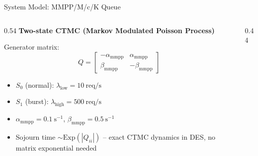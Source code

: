 \documentclass[aspectratio=169,t]{beamer}
\begin{document}
\begin{frame}{System Model: MMPP/M/c/K Queue}

  \begin{columns}[T]
    \begin{column}{0.54\textwidth}
      \textbf{Two-state CTMC (Markov Modulated Poisson Process)}

      \vspace{4pt}
      Generator matrix:
      \[
        Q = \begin{bmatrix}
          -\alpha_{\mathrm{mmpp}} & \alpha_{\mathrm{mmpp}} \\
          \beta_{\mathrm{mmpp}}   & -\beta_{\mathrm{mmpp}}
        \end{bmatrix}
      \]

      \begin{itemize}\setlength\itemsep{3pt}
        \item $S_0$ (normal): $\lambda_{\mathrm{low}} = 10\ \mathrm{req/s}$
        \item $S_1$ (burst): $\lambda_{\mathrm{high}} = 500\ \mathrm{req/s}$
        \item $\alpha_{\mathrm{mmpp}} = 0.1\ \mathrm{s}^{-1}$,\;
              $\beta_{\mathrm{mmpp}} = 0.5\ \mathrm{s}^{-1}$
        \item Sojourn time $\sim \mathrm{Exp}(|Q_{ii}|)$
        {\footnotesize -- exact CTMC dynamics in DES, no matrix exponential needed}
      \end{itemize}
    \end{column}

    \begin{column}{0.44\textwidth}
      \begin{center}
      \vspace{6pt}
      \end{center}


\end{column}
\end{columns}
\end{frame}
\end{document}
